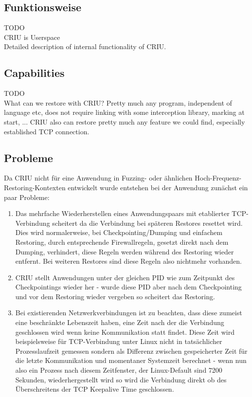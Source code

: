\documentclass[a4paper]{article}
\begin{document}
\subsection{Funktionsweise}
TODO\\
CRIU is Userspace \\
Detailed description of internal functionality of CRIU.
\subsection{Capabilities}
TODO\\
What can we restore with CRIU? Pretty much any program, independent of language etc, does not require linking with some interception library, marking at start, ... CRIU also can restore pretty much any feature we could find, especially established TCP connection.
\subsection{Probleme}
Da CRIU nicht für eine Anwendung in Fuzzing- oder ähnlichen Hoch-Frequenz-Restoring-Kontexten entwickelt wurde entstehen bei der Anwendung zunächst ein paar Probleme:
\begin{enumerate}
    \item Das mehrfache Wiederherstellen eines Anwendungspaars mit etablierter TCP-Verbindung scheitert da die Verbindung bei späteren Restores resettet wird. Dies wird normalerweise, bei Checkpointing/Dumping und einfachem Restoring, durch entsprechende Firewallregeln, gesetzt direkt nach dem Dumping, verhindert, diese Regeln werden während des Restoring wieder entfernt. Bei weiteren Restores sind diese Regeln also nichtmehr vorhanden.
    \item CRIU stellt Anwendungen unter der gleichen PID wie zum Zeitpunkt des Checkpointings wieder her - wurde diese PID aber nach dem Checkpointing und vor dem Restoring wieder vergeben so scheitert das Restoring.
    \item Bei existierenden Netzwerkverbindungen ist zu beachten, dass diese zumeist eine beschränkte Lebenszeit haben, eine Zeit nach der die Verbindung geschlossen wird wenn keine Kommunikation statt findet. Diese Zeit wird beispielsweise für TCP-Verbindung unter Linux nicht in tatsächlicher Prozesslaufzeit gemessen sondern als Differenz zwischen gespeicherter Zeit für die letzte Kommunikation und momentaner Systemzeit berechnet - wenn nun also ein Prozess nach diesem Zeitfenster, der Linux-Default sind 7200 Sekunden, wiederhergestellt wird so wird die Verbindung direkt ob des Überschreitens der TCP Keepalive Time geschlossen.
\end{enumerate}
\end{document}
